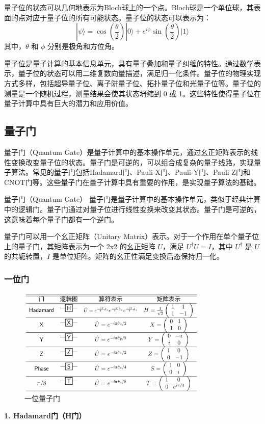 量子位的状态可以几何地表示为Bloch球上的一个点。Bloch球是一个单位球，其表面的点对应于量子位的所有可能状态。量子位的状态可以表示为：
     \[
     |\psi\rangle = \cos\left(\frac{\theta}{2}\right) |0\rangle + e^{i\phi} \sin\left(\frac{\theta}{2}\right) |1\rangle
     \]
其中，\(\theta\) 和 \(\phi\) 分别是极角和方位角。

量子位是量子计算的基本信息单元，具有量子叠加和量子纠缠的特性。通过数学表示，量子位的状态可以用二维复数向量描述，满足归一化条件。量子位的物理实现方式多样，包括超导量子位、离子阱量子位、拓扑量子位和光量子位等。量子位的测量是一个随机过程，测量结果会使其状态坍缩到 0 或 1。这些特性使得量子位在量子计算中具有巨大的潜力和应用价值。

\subsection{量子门}
量子门（Quantum Gate）是量子计算中的基本操作单元，通过幺正矩阵表示的线性变换改变量子位的状态。量子门是可逆的，可以组合成复杂的量子线路，实现量子算法。常见的量子门包括Hadamard门、Pauli-X门、Pauli-Y门、Pauli-Z门和CNOT门等。这些量子门在量子计算中具有重要的作用，是实现量子算法的基础。
\begin{define}{量子门（Quantum Gate）}
     量子门是量子计算中的基本操作单元，类似于经典计算中的逻辑门。量子门通过对量子位进行线性变换来改变其状态。量子门是可逆的，这意味着每个量子门都有一个逆门。

     量子门可以用一个幺正矩阵（Unitary Matrix）表示。对于一个作用在单个量子位上的量子门，其矩阵表示为一个 2x2 的幺正矩阵 \(U\)，满足 \(U^\dagger U = I\)，其中 \(U^\dagger\) 是 \(U\) 的共轭转置，\(I\) 是单位矩阵。矩阵的幺正性满足变换后态保持归一化。
\end{define}

\subsubsection{一位门}
\begin{figure}[htbp]
     \centering
     \caption{一位量子门}
     \includegraphics[width=0.8\textwidth]{figures/onedoor.png}
\end{figure}
\textbf{1. Hadamard门（H门）}

